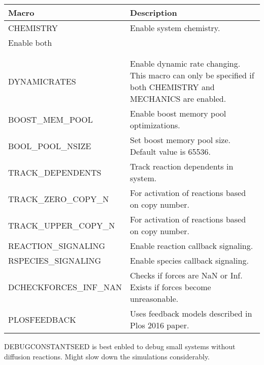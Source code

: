 \documentclass[11pt, oneside]{article}   	%
\begin{document}
\small
\begin{table} [!ht]
\centering
\begin{tabular}{|L{5cm}|L{9cm}|}  
\hline
 \textbf{Macro} & \textbf{Description} \\
 \hline
  CHEMISTRY & Enable system chemistry. \\
  \hline
  Enable both\\
   &  \\ 
  \hline\hline
  
     &  \\ 
  \hline\hline
  DYNAMICRATES & Enable dynamic rate changing. This macro can only be specified if both CHEMISTRY and
  MECHANICS are enabled. \\
  \hline
  BOOST\_MEM\_POOL & Enable boost memory pool optimizations. \\
  \hline
   BOOL\_POOL\_NSIZE & Set boost memory pool size. Default value is 65536. \\
  \hline
   TRACK\_DEPENDENTS & Track reaction dependents in system. \\
  \hline
    TRACK\_ZERO\_COPY\_N & For activation of reactions based on copy number. \\
  \hline
     TRACK\_UPPER\_COPY\_N & For activation of reactions based on copy number. \\
  \hline
     REACTION\_SIGNALING & Enable reaction callback signaling. \\
  \hline
     RSPECIES\_SIGNALING & Enable species callback signaling.\\
  \hline
  DCHECKFORCES\_INF\_NAN & Checks if forces are NaN or Inf. Exists if forces become unreasonable.\\
  \hline
          PLOSFEEDBACK & Uses feedback models described in Plos 2016 paper.\\
  \hline
\end{tabular}
\end{table}
   DEBUGCONSTANTSEED is best enbled to debug small systems without diffusion reactions. Might slow down the simulations considerably.
\normalsize
\end{document}
